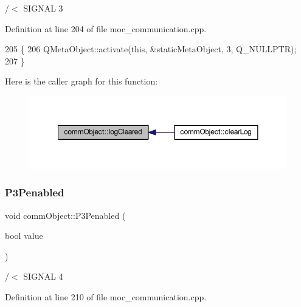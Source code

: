 /$<$ S\+I\+G\+N\+AL 3 



Definition at line 204 of file moc\+\_\+communication.\+cpp.


\begin{DoxyCode}
205 \{
206     QMetaObject::activate(\textcolor{keyword}{this}, &staticMetaObject, 3, Q\_NULLPTR);
207 \}
\end{DoxyCode}
Here is the caller graph for this function\+:\nopagebreak
\begin{figure}[H]
\begin{center}
\leavevmode
\includegraphics[width=350pt]{classcomm_object_af2304085624c26230e9d930d616e3e19_icgraph}
\end{center}
\end{figure}
\mbox{\label{classcomm_object_af369de87a7f2c9b7170223bedd6c08d9}} 
\subsubsection{\texorpdfstring{P3\+Penabled}{P3Penabled}}
{\footnotesize\ttfamily void comm\+Object\+::\+P3\+Penabled (\begin{DoxyParamCaption}\item[{bool}]{value }\end{DoxyParamCaption})\hspace{0.3cm}{\ttfamily [signal]}}



/$<$ S\+I\+G\+N\+AL 4 



Definition at line 210 of file moc\+\_\+communication.\+cpp.


